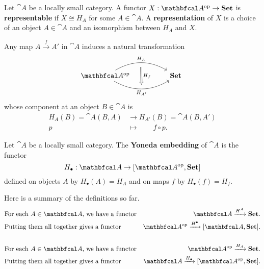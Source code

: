 \begin{definition}
    Let $\cat{A}$ be a locally small category. A functor $X:\catop{A}\to\bcat{Set}$ is \textbf{representable} if $X\cong H_A$ for some $A\in\cat{A}$. A \textbf{representation} of $X$ is a choice of an object $A\in\cat{A}$ and an isomorphism between $H_A$ and $X$.
\end{definition}

Any map $A\xrightarrow{f}A'$ in $\cat{A}$ induces a natural transformation
\begin{equation*}
\begin{tikzcd}
    \catop{A}
    \arrow[rr, bend left=30, "H_A"{name=t}]
    \arrow[rr, bend right=30, "H_{A'}"'{name=b}]
    && \bcat{Set} \
    \arrow[from=t, Rightarrow, to=b, "H_f", shorten <= 6pt, shorten >= 6pt]
\end{tikzcd}
\end{equation*}
whose component at an object $B\in\cat{A}$ is 
\begin{align*}
    H_A(B)=\cat{A}(B,A) &\to H_{A'}(B)=\cat{A}(B,A')\\
    p\qquad &\mapsto\qquad f\circ p.
\end{align*}

\begin{definition}
    Let $\cat{A}$ be a locally small category. The \textbf{Yoneda embedding} of $\cat{A}$ is the functor
    \begin{equation*}
        H_{\bullet}:\cat{A}\to [\catop{A},\bcat{Set}]
    \end{equation*}
    defined on objects $A$ by $H_{\bullet}(A)=H_A$ and on maps $f$ by $H_{\bullet}(f)=H_f$.
\end{definition}

Here is a summary of the definitions so far.
\begin{align*}
    &\text{For each $A\in\cat{A}$, we have a functor} &\cat{A} \xrightarrow{H^A} \bcat{Set}.\\
    &\text{Putting them all together gives a functor} &\catop{A} \xrightarrow{H^{\bullet}} [\cat{A},\bcat{Set}].\\ \\
    &\text{For each $A\in\cat{A}$, we have a functor} &\catop{A} \xrightarrow{H_A} \bcat{Set}.\\
    &\text{Putting them all together gives a functor} &\cat{A} \xrightarrow{H_{\bullet}} [\catop{A},\bcat{Set}].
\end{align*}


